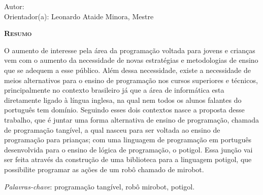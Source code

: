 \begin{center}
	{\Large{\textbf{\ABNTtitulodata}}}
\end{center}

\vspace{1cm}

\begin{flushright}
  Autor: \ABNTautordata\\
  Orientador(a): Leonardo Ataide Minora, Mestre
\end{flushright}

\vspace{1cm}

\begin{center}
	\Large{\textsc{\textbf{Resumo}}}
\end{center}

\noindent O aumento de interesse pela área da programação voltada para jovens e
crianças vem com o aumento da necessidade de novas estratégias e metodologias
de ensino que se adequem a esse público. Além dessa necessidade, existe a
necessidade de meios alternativos para o ensino de programação nos cursos
superiores e técnicos, principalmente no contexto brasileiro já que a área de
informática esta diretamente ligado à língua inglesa, na qual nem todos os
alunos falantes do português tem domínio. Seguindo esses dois contextos nasce a
proposta desse trabalho, que é juntar uma forma alternativa de ensino de
programação, chamada de programação tangível, a qual nasceu para ser voltada ao
ensino de programação para prianças; com uma linguagem de programação em
português desenvolvida para o ensino de lógica de programação, o potigol. Essa
junção vai ser feita através da construção de uma biblioteca para a linguagem
potigol, que possibilite programar as ações de um robô chamado de mirobot.


\noindent\textit{Palavras-chave}: programação tangível, robô mirobot, potigol.
